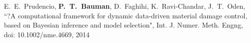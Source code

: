 E.~E.~Prudencio, \textbf{P.~T.~Bauman}, D.~Faghihi, K.~Ravi-Chandar, J.~T.~Oden,
``?A computational framework for dynamic data-driven material damage control,
based on Bayesian inference and model selection",
Int. J. Numer. Meth. Engng, doi: 10.1002/nme.4669, 2014

